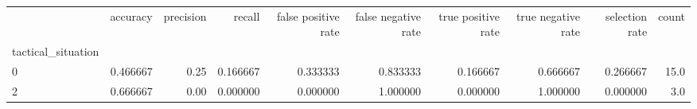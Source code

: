 \begin{tabular}{lrrrrrrrrr}
\toprule
{} &  accuracy &  precision &    recall &  false positive rate &  false negative rate &  true positive rate &  true negative rate &  selection rate &  count \\
tactical\_situation &           &            &           &                      &                      &                     &                     &                 &        \\
\midrule
0                  &  0.466667 &       0.25 &  0.166667 &             0.333333 &             0.833333 &            0.166667 &            0.666667 &        0.266667 &   15.0 \\
2                  &  0.666667 &       0.00 &  0.000000 &             0.000000 &             1.000000 &            0.000000 &            1.000000 &        0.000000 &    3.0 \\
\bottomrule
\end{tabular}
